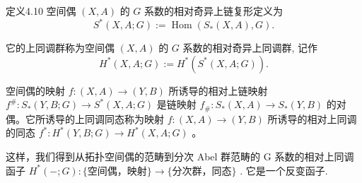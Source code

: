 \documentclass[]{article}
\begin{document}
定义4.10 空间偶 $(X,A)$ 的 $G$ 系数的相对奇异上链复形定义为 $$
S ^ {*} (X, A; G) := \operatorname{Hom} \left(S _ {*} (X, A), G\right).
$$

它的上同调群称为空间偶 $(X, A)$ 的 $G$ 系数的相对奇异上同调群, 记作 $$
H ^ {*} (X, A; G) := H ^ {*} (S ^ {*} (X, A; G)).
$$

空间偶的映射 $f: (X, A) \to (Y, B)$ 所诱导的相对上链映射 $f^{\#}: S_{*}(Y, B; G) \to S^{*}(X, A; G)$ 是链映射 $f_{\#}: S_{*}(X, A) \to S_{*}(Y, B)$ 的对偶。它所诱导的上同调同态称为映射 $f: (X, A) \to (Y, B)$ 所诱导的相对上同调的同态 $f^{*}: H^{*}(Y, B; G) \to H^{*}(X, A; G)$ 。 

这样，我们得到从拓扑空间偶的范畴到分次 Abel 群范畴的 G 系数的相对上同调函子 $H^{*}(-;G):\{\text{空间偶，映射}\}\rightarrow\{\text{分次群，同态}\}$ . 它是一个反变函子. 
\end{document}
